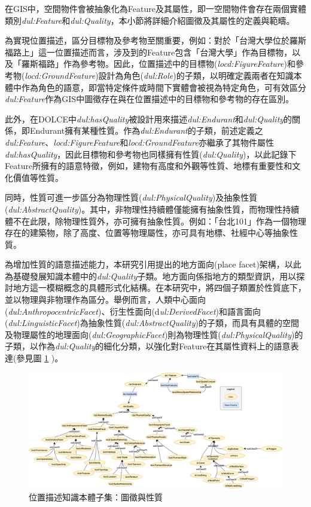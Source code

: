 在GIS中，空間物件會被抽象化為Feature及其屬性，即一空間物件會存在兩個實體類別\textit{dul:Feature}和\textit{dul:Quality}，本小節將詳細介紹圖徵及其屬性的定義與範疇。

為實現位置描述，區分目標物及參考物至關重要，例如：對於「台灣大學位於羅斯福路上」這一位置描述而言，涉及到的Feature包含「台灣大學」作為目標物，以及「羅斯福路」作為參考物。因此，位置描述中的目標物(\textit{locd:FigureFeature})和參考物(\textit{locd:GroundFeature})設計為角色(\textit{dul:Role})的子類，以明確定義兩者在知識本體中作為角色的語意，即當特定條件或時間下實體會被視為特定角色，可有效區分\textit{dul:Feature}作為GIS中圖徵存在與在位置描述中的目標物和參考物的存在區別。

此外，在DOLCE中\textit{dul:hasQuality}被設計用來描述\textit{dul:Endurant}和\textit{dul:Quality}的關係，即Endurant擁有某種性質。作為\textit{dul:Endurant}的子類，前述定義之\textit{dul:Feature}、\textit{locd:FigureFeature}和\textit{locd:GroundFeature}亦繼承了其物件屬性\textit{dul:hasQuality}，因此目標物和參考物也同樣擁有性質(\textit{dul:Quality})，以此記錄下Feature所擁有的語意特徵，例如，建物有高度和外觀等性質、地標有重要性和文化價值等性質。

同時，性質可進一步區分為物理性質(\textit{dul:PhysicalQuality})及抽象性質(\textit{dul:AbstractQuality})。其中，非物理性持續體僅能擁有抽象性質，而物理性持續體不在此限，除物理性質外，亦可擁有抽象性質。例如：「台北101」作為一個物理存在的建築物，除了高度、位置等物理屬性，亦可具有地標、社經中心等抽象性質。

為增加性質的語意描述能力，本研究引用\citet{RN39}提出的地方面向(place facet)架構，以此為基礎發展知識本體中的\textit{dul:Quality}子類。地方面向係指地方的類型資訊，用以探討地方這一模糊概念的具體形式化結構。在本研究中，將四個子類置於性質底下，並以物理與非物理作為區分。舉例而言，人類中心面向(\textit{dul:AnthropocentricFacet})、衍生性面向(d\textit{ul:DerivedFacet})和語言面向(\textit{dul:LinguisticFacet})為抽象性質(\textit{dul:AbstractQuality})的子類，而具有具體的空間及物理屬性的地理面向(\textit{dul:GeographicFacet})則為物理性質(\textit{dul:PhysicalQuality})的子類，以作為\textit{dul:Quality}的細化分類，以強化對Feature在其屬性資料上的語意表達(參見圖 \ref{fig:locd_quality} )。

\begin{figure}[!htbp]
\centering
\includegraphics[width = \textwidth]{figures/LocD_quality.png}
\caption{位置描述知識本體子集：圖徵與性質}
\label{fig:locd_quality}
\end{figure}

